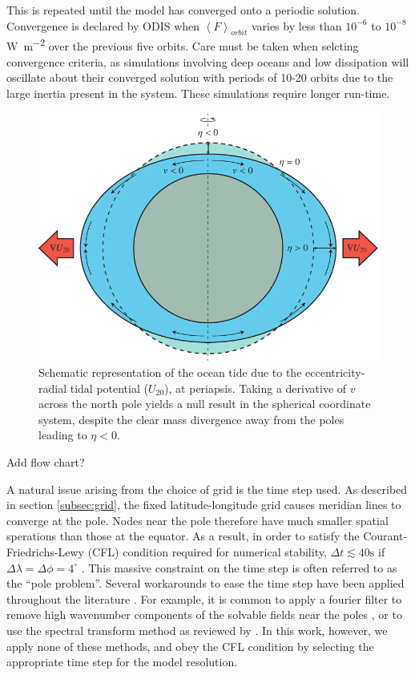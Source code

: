 This is repeated until the model has converged onto a periodic solution. Convergence is declared by ODIS when $\left\langle F \right\rangle_{orbit}$ varies by less than $10^{-6}$ to $10^{-8}$ \si{\watt\per\square\metre} over the previous five orbits. Care must be taken when selcting convergence criteria, as simulations involving deep oceans and low dissipation will oscillate about their converged solution with periods of 10-20 orbits due to the large inertia present in the system. These simulations require longer run-time.

\begin{figure}[t]
\includegraphics[width=\linewidth]{Figures/CoordProb}
\caption{Schematic representation of the ocean tide due to the eccentricity-radial tidal potential ($U_{20}$), at periapsis. Taking a derivative of $v$ across the north pole yields a null result in the spherical coordinate system, despite the clear mass divergence away from the poles leading to $\eta < 0$.\label{fig:coord_prob}}
\end{figure}

Add flow chart?

A natural issue arising from the choice of grid is the time step used. As described in section \ref{subsec:grid}, the fixed latitude-longitude grid causes meridian lines to converge at the pole. Nodes near the pole therefore have much smaller spatial sperations than those at the equator. As a result, in order to satisfy the Courant-Friedrichs-Lewy (CFL) condition required for numerical stability, $\Delta t \lesssim 40 \si{\second}$ if $\Delta \lambda = \Delta \phi = 4^{\circ}$ \citep{arakawa1977computational,sears1995tidal}. This massive constraint on the time step is often referred to as the ``pole problem''. Several workarounds to ease the time step have been applied throughout the literature \citep{comblen2009finite}. For example, it is common to apply a fourier filter to remove high wavenumber components of the solvable fields near the poles \citep{murray2002fourier}, or to use the spectral transform method as reviewed by \citet{swarztrauber1996spectral}. In this work, however, we apply none of these methods, and obey the CFL condition by selecting the appropriate time step for the model resolution.

